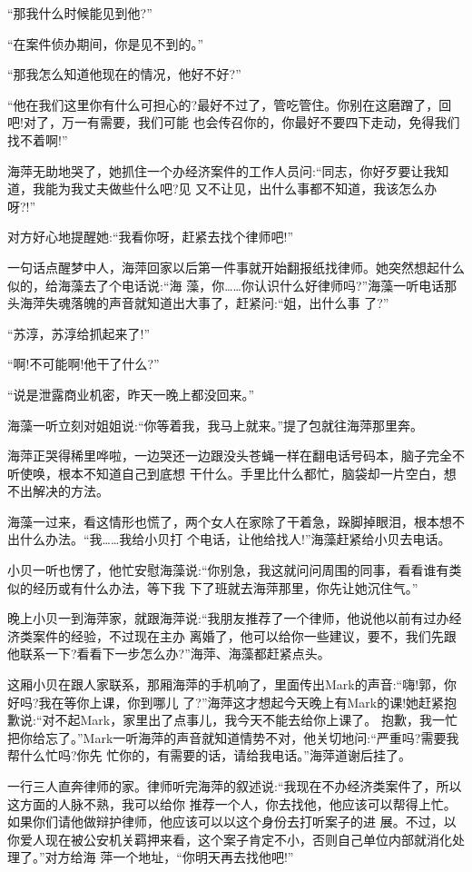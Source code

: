 \documentclass[11pt,a4paper,onecolumn]{article}
\begin{document}
``那我什么时候能见到他?''

``在案件侦办期间，你是见不到的。''

``那我怎么知道他现在的情况，他好不好?''

``他在我们这里你有什么可担心的?最好不过了，管吃管住。你别在这磨蹭了，回吧!对了，万一有需要，我们可能
也会传召你的，你最好不要四下走动，免得我们找不着啊!''

海萍无助地哭了，她抓住一个办经济案件的工作人员问:``同志，你好歹要让我知道，我能为我丈夫做些什么吧?见
又不让见，出什么事都不知道，我该怎么办呀?!''

对方好心地提醒她:``我看你呀，赶紧去找个律师吧!''

一句话点醒梦中人，海萍回家以后第一件事就开始翻报纸找律师。她突然想起什么似的，给海藻去了个电话说:``海
藻，你……你认识什么好律师吗?''海藻一听电话那头海萍失魂落魄的声音就知道出大事了，赶紧问:``姐，出什么事
了?''

``苏淳，苏淳给抓起来了!''

``啊!不可能啊!他干了什么?''

``说是泄露商业机密，昨天一晚上都没回来。''

海藻一听立刻对姐姐说:``你等着我，我马上就来。''提了包就往海萍那里奔。

海萍正哭得稀里哗啦，一边哭还一边跟没头苍蝇一样在翻电话号码本，脑子完全不听使唤，根本不知道自己到底想
干什么。手里比什么都忙，脑袋却一片空白，想不出解决的方法。

海藻一过来，看这情形也慌了，两个女人在家除了干着急，跺脚掉眼泪，根本想不出什么办法。``我……我给小贝打
个电话，让他给找人!''海藻赶紧给小贝去电话。

小贝一听也愣了，他忙安慰海藻说:``你别急，我这就问问周围的同事，看看谁有类似的经历或有什么办法，等下我
下了班就去海萍那里，你先让她沉住气。''

晚上小贝一到海萍家，就跟海萍说:``我朋友推荐了一个律师，他说他以前有过办经济类案件的经验，不过现在主办
离婚了，他可以给你一些建议，要不，我们先跟他联系一下?看看下一步怎么办?''海萍、海藻都赶紧点头。

这厢小贝在跟人家联系，那厢海萍的手机响了，里面传出Mark的声音:``嗨!郭，你好吗?我在等你上课，你到哪儿
了?''海萍这才想起今天晚上有Mark的课!她赶紧抱歉说:``对不起Mark，家里出了点事儿，我今天不能去给你上课了。
抱歉，我一忙把你给忘了。''Mark一听海萍的声音就知道情势不对，他关切地问:``严重吗?需要我帮什么忙吗?你先
忙你的，有需要的话，请给我电话。''海萍道谢后挂了。

一行三人直奔律师的家。律师听完海萍的叙述说:``我现在不办经济类案件了，所以这方面的人脉不熟，我可以给你
推荐一个人，你去找他，他应该可以帮得上忙。如果你们请他做辩护律师，他应该可以以这个身份去打听案子的进
展。不过，以你爱人现在被公安机关羁押来看，这个案子肯定不小，否则自己单位内部就消化处理了。''对方给海
萍一个地址，``你明天再去找他吧!''
\end{document}
